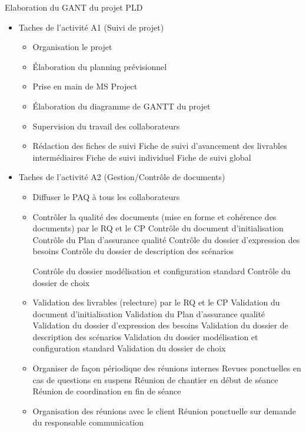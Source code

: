 Elaboration du GANT du projet PLD
\begin{itemize}
    \item Taches de l’activité A1 (Suivi de projet)
    \begin{itemize}
        \item Organisation le projet
        \item Élaboration du planning prévisionnel
        \item Prise en main de MS Project
        \item Élaboration du diagramme de GANTT du projet
        \item Supervision du travail des collaborateurs
        \item Rédaction des fiches de suivi
            \subitem Fiche de suivi d’avancement des livrables intermédiaires
            \subitem Fiche de suivi individuel
            \subitem Fiche de suivi global
    \end{itemize}

    \item Taches de l’activité A2 (Gestion/Contrôle de documents)
    \begin{itemize}
        \item Diffuser le  PAQ à tous les collaborateurs
        \item Contrôler la qualité des documents (mise en forme et cohérence des documents) par le RQ et le CP
            \subitem Contrôle du document d’initialisation
            \subitem Contrôle du Plan d’assurance qualité
            \subitem Contrôle du dossier d’expression des besoins
            \subitem Contrôle du dossier de description des scénarios

            \subitem Contrôle du dossier modélisation et configuration standard
            \subitem Contrôle du dossier de choix

        \item Validation des livrables (relecture) par le RQ et le CP
            \subitem Validation du document d’initialisation
            \subitem Validation du Plan d’assurance qualité
            \subitem Validation du dossier d’expression des besoins
            \subitem Validation du dossier de description des scénarios
            \subitem Validation du dossier modélisation et configuration standard
            \subitem Validation du dossier de choix

        \item Organiser de façon périodique des réunions internes
            \subitem Revues ponctuelles en cas de questions en suspens
            \subitem Réunion de chantier en début de séance
            \subitem Réunion de coordination en fin de séance
        \item Organisation des réunions avec le client
            \subitem Réunion ponctuelle sur demande du responsable communication
    \end{itemize}



\end{itemize}
